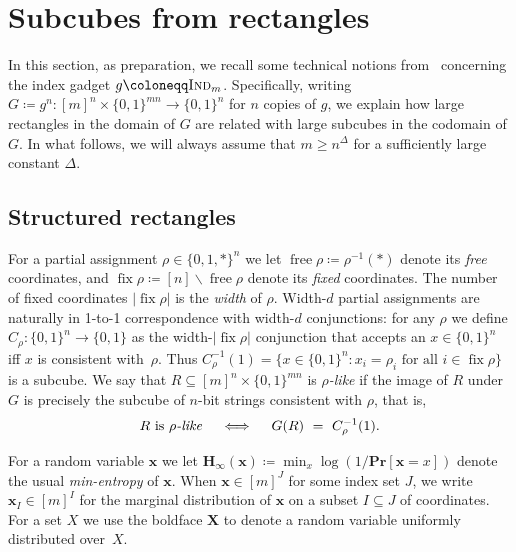 \documentclass[11pt]{article}
\numberwithin{equation}{section}
\theoremstyle{definition}
\theoremstyle{plain}
\renewcommand{\Pr}{\mathbf{Pr}}
\newcommand{\Hmin}{\mathbf{H}_\infty}
\DeclareMathOperator{\free}{free}
\DeclareMathOperator{\fix}{fix}
\newcommand{\Ind}{\textsc{Ind}}
\newcommand{\x}{\bm{x}}
\newcommand{\X}{\bm{X}}
\newcommand{\allX}{[m]^n}
\newcommand{\allY}{\{0,1\}^{mn}}
\begin{document}
\section{Subcubes from rectangles} \label{sec:tools}

In this section, as preparation, we recall some technical notions from~\cite{goos16rectangles,goos17bpp} concerning the index gadget $g\coloneqq \Ind_m$.
%
Specifically,  %
writing $G\coloneqq g^n\colon\allX\times\allY\to\{0,1\}^n$ for $n$ copies of $g$, we explain how large rectangles in
the domain of $G$ %
are related with large subcubes in
the codomain of $G$. %
In what follows, we will always assume that $m \ge n^\Delta$ for a sufficiently large constant $\Delta$.

\subsection{Structured rectangles}
For a partial assignment $\rho\in\{0,1,*\}^n$ we let $\free\rho\coloneqq \rho^{-1}(*)$ denote its \emph{free} coordinates, and $\fix\rho\coloneqq[n]\smallsetminus\free\rho$ denote its \emph{fixed} coordinates. The number of fixed coordinates $|\!\fix\rho|$ is the \emph{width} of $\rho$. Width-$d$ partial assignments are naturally in 1-to-1 correspondence with width-$d$ conjunctions: for any $\rho$ we define $C_\rho\colon \{0,1\}^n\to\{0,1\}$ as the width-$|\!\fix\rho|$ conjunction that accepts an $x\in\{0,1\}^n$ iff $x$ is consistent with~$\rho$. Thus $C_\rho^{-1}(1)=\{x\in\{0,1\}^n: x_i = \rho_i \text{ for all } i \in \fix\rho\}$ is a subcube. We say that $R\subseteq\allX\times\allY$ is \emph{$\rho$-like} if the image of $R$ under $G$ is precisely the subcube of $n$-bit strings consistent with $\rho$, that is,
\[
R \text{ is \emph{$\rho$-like}}
\quad\iff\quad G(R)~=~C_\rho^{-1}(1).
\]


For a random variable $\x$ we let $\Hmin(\x)\coloneqq\min_x \log(1/\Pr[\x=x])$ denote the usual \emph{min-entropy} of $\x$. When $\x\in[m]^J$ for some index set $J$, we write $\x_I\in[m]^I$ for the marginal distribution of $\x$ on a subset $I\subseteq J$ of coordinates. For a set $X$ we use the boldface $\X$ to denote a random variable uniformly distributed over~$X$.
\end{document}
